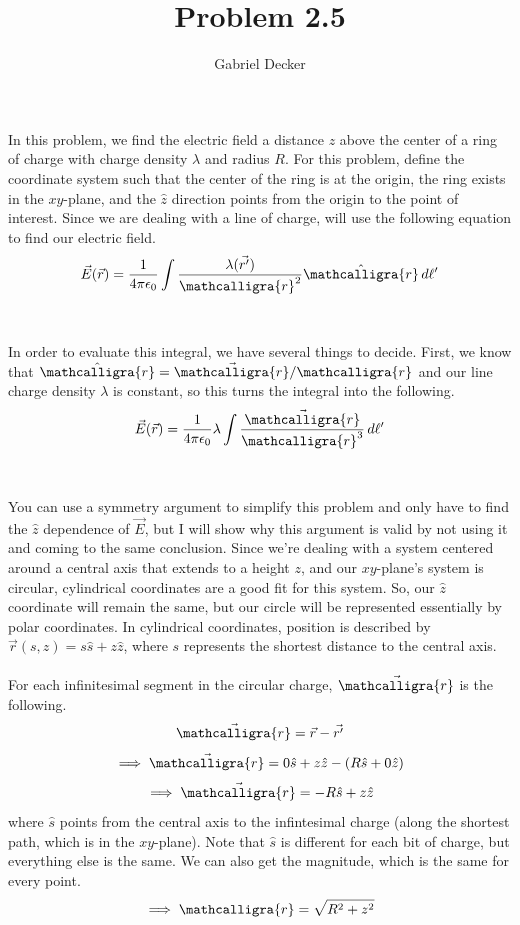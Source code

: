 \documentclass[12pt]{article}
\title{Problem 2.5}
\author{Gabriel Decker}
\newcommand{\scripty}[1]{\ensuremath{\mathcalligra{#1}}}
\begin{document}
\maketitle
\begin{flushleft}


In this problem, we find the electric field a distance $z$ above the center of a ring of charge with charge density $\lambda$ and radius $R$.
For this problem, define the coordinate system such that the center of the ring is at the origin, the ring exists in the $xy$-plane, and the $\hat{z}$ direction points from the origin to the point of interest.
Since we are dealing with a line of charge, will use the following equation to find our electric field.
$$\vec{E}(\vec{r})=\frac{1}{4\pi\epsilon_0}\int\frac{\lambda(\vec{r'})}{\scripty{r}^2}\hat{\scripty{r}}\,d\ell'$$\\~\\

In order to evaluate this integral, we have several things to decide.
First, we know that $\hat{\scripty{r}}=\vec{\scripty{r}}/\scripty{r}$ and our line charge density $\lambda$ is constant, so this turns the integral into the following.
$$\vec{E}(\vec{r})=\frac{1}{4\pi\epsilon_0}\lambda\int\frac{\vec{\scripty{r}}}{\scripty{r}^3}\,d\ell'$$\\~\\

You can use a symmetry argument to simplify this problem and only have to find the $\hat{z}$ dependence of $\vec{E}$, but I will show why this argument is valid by not using it and coming to the same conclusion.
Since we're dealing with a system centered around a central axis that extends to a height $z$, and our $xy$-plane's system is circular, cylindrical coordinates are a good fit for this system.
So, our $\hat{z}$ coordinate will remain the same, but our circle will be represented essentially by polar coordinates.
In cylindrical coordinates, position is described by $\vec{r}(s,z)=s\hat{s}+z\hat{z}$, where $s$ represents the shortest distance to the central axis.\\~\\

For each infinitesimal segment in the circular charge, $\vec{\scripty{r}}$ is the following.
$$\vec{\scripty{r}}=\vec{r}-\vec{r'}$$
$$\implies\vec{\scripty{r}}=0\hat{s}+z\hat{z}-\left(R\hat{s}+0\hat{z}\right)$$
$$\implies\vec{\scripty{r}}=-R\hat{s}+z\hat{z}$$
where $\hat{s}$ points from the central axis to the infintesimal charge (along the shortest path, which is in the $xy$-plane).
Note that $\hat{s}$ is different for each bit of charge, but everything else is the same.
We can also get the magnitude, which is the same for every point.
$$\implies\scripty{r}=\sqrt{R^2+z^2}$$\\~\\


\end{flushleft}
\end{document}
